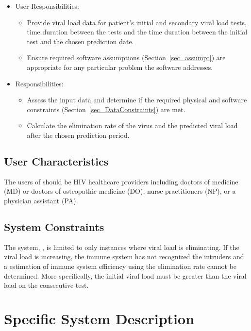 \documentclass[12pt]{article}
\begin{document}
\begin{itemize}
\item User Responsibilities:
\begin{itemize}
\item Provide viral load data for patient's initial and secondary viral load 
tests, time duration between the tests and the time duration between the initial 
test and the chosen prediction date.
\item Ensure required software assumptions (Section~\ref{sec_assumpt}) are 
appropriate for any particular problem the software addresses.

\end{itemize}
\item \progname{} Responsibilities:
\begin{itemize}
\item Assess the input data and determine if the required physical and software 
constraints (Section~\ref{sec_DataConstraints}) are met.
\item Calculate the elimination rate of the virus and the predicted viral load 
after the chosen prediction period.
\end{itemize}
\end{itemize}

\subsection{User Characteristics} \label{SecUserCharacteristics}
The users of \progname{} should be HIV healthcare providers including 
doctors of medicine (MD) or doctors of osteopathic medicine (DO), nurse 
practitioners (NP), or a physician assistant (PA). \citep{cdc}


\subsection{System Constraints} \label{Sec_constraints}

The system, \progname{}, is limited to only instances where viral load 
is eliminating. If 
the viral load is increasing, the immune system has not recognized the intruders 
and a estimation of immune system efficiency using the elimination rate cannot 
be determined. More specifically, the 
initial viral load must be greater than the viral load on the consecutive test.

\section{Specific System Description}
\end{document}
